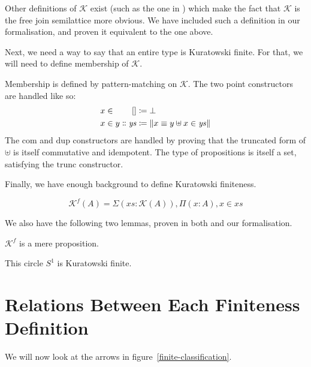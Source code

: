 Other definitions of \(\mathcal{K}\) exist (such as the one in
\cite{fruminFiniteSetsHomotopy2018}) which make the fact that \(\mathcal{K}\) is
the free join semilattice more obvious.
We have included such a definition in our formalisation, and proven it
equivalent to the one above.

Next, we need a way to say that an entire type is Kuratowski finite.
For that, we will need to define membership of \(\mathcal{K}\).
\begin{romdefinition}
  Membership is defined by pattern-matching on \(\mathcal{K}\).
  The two point constructors are handled like so:
  \begin{equation}
    \begin{alignedat}{2}
      x \in&& \; []                      &\coloneqq \bot \\
      x \in&& \; y \dblcolon \mathit{ys} &\coloneqq \lVert x \equiv y \uplus x \in \mathit{ys} \rVert
    \end{alignedat}
  \end{equation}
  The \(\text{com}\) and \(\text{dup}\) constructors are handled by proving that
  the truncated form of \(\uplus\) is itself commutative and idempotent.
  The type of propositions is itself a set, satisfying the \(\text{trunc}\)
  constructor.
\end{romdefinition}
Finally, we have enough background to define Kuratowski finiteness.
\begin{romdefinition}
  \begin{equation}
    \mathcal{K}^{f}(A) = \Sigma {(\mathit{xs} : \mathcal{K}(A))} , \Pi (x : A) , x \in \mathit{xs}
  \end{equation}
\end{romdefinition}

We also have the following two lemmas, proven in both
\cite{fruminFiniteSetsHomotopy2018} and our formalisation.
\begin{romlemma}
  \(\mathcal{K}^f\) is a mere proposition.
\end{romlemma}
\begin{romlemma}
  This circle \(S^1\) is Kuratowski finite.
\end{romlemma}
\section{Relations Between Each Finiteness Definition} \label{relations}
We will now look at the arrows in figure~\ref{finite-classification}.

